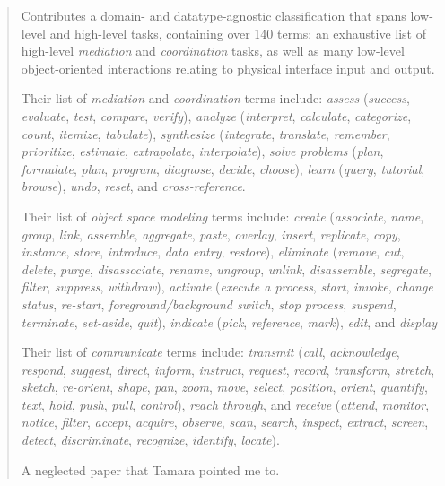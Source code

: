 \begin{quotation}
    Contributes a domain- and datatype-agnostic classification that spans low-level and high-level tasks, containing over 140 terms: an exhaustive list of high-level {\it mediation} and {\it coordination} tasks, as well as many low-level object-oriented interactions relating to physical interface input and output.
    
    Their list of {\it mediation} and {\it coordination} terms include: {\it assess} ({\it success}, {\it evaluate}, {\it test}, {\it compare}, {\it verify}), {\it analyze} ({\it interpret}, {\it calculate}, {\it categorize}, {\it count}, {\it itemize}, {\it tabulate}), {\it synthesize} ({\it integrate}, {\it translate}, {\it remember}, {\it prioritize}, {\it estimate}, {\it extrapolate}, {\it interpolate}), {\it solve problems} ({\it plan}, {\it formulate}, {\it plan}, {\it program}, {\it diagnose}, {\it decide}, {\it choose}), {\it learn} ({\it query}, {\it tutorial}, {\it browse}), {\it undo}, {\it reset}, and {\it cross-reference}.
    
    Their list of {\it object space modeling} terms include:
    {\it create} ({\it associate}, {\it name}, {\it group}, {\it link}, {\it assemble}, {\it aggregate}, {\it paste}, {\it overlay}, {\it insert}, {\it replicate}, {\it copy}, {\it instance}, {\it store}, {\it introduce}, {\it data entry}, {\it restore}), {\it eliminate} ({\it remove}, {\it cut}, {\it delete}, {\it purge}, {\it disassociate}, {\it rename}, {\it ungroup}, {\it unlink}, {\it disassemble}, {\it segregate}, {\it filter}, {\it suppress}, {\it withdraw}), {\it activate} ({\it execute a process}, {\it start}, {\it invoke}, {\it change status}, {\it re-start}, {\it foreground/background switch}, {\it stop process}, {\it suspend}, {\it terminate}, {\it set-aside}, {\it quit}), {\it indicate} ({\it pick}, {\it reference}, {\it mark}), {\it edit}, and {\it display}
    
    \begin{sloppypar}
    Their list of {\it communicate} terms include: {\it transmit} ({\it call}, {\it acknowledge}, {\it respond}, {\it suggest}, {\it direct}, {\it inform}, {\it instruct}, {\it request}, {\it record}, {\it transform}, {\it stretch}, {\it sketch}, {\it re-orient}, {\it shape}, {\it pan}, {\it zoom}, {\it move}, {\it select}, {\it position}, {\it orient}, {\it quantify}, {\it text}, {\it hold}, {\it push}, {\it pull}, {\it control}), {\it reach through}, and {\it receive} ({\it attend}, {\it monitor}, {\it notice}, {\it filter}, {\it accept}, {\it acquire}, {\it observe}, {\it scan}, {\it search}, {\it inspect}, {\it extract}, {\it screen}, {\it detect}, {\it discriminate}, {\it recognize}, {\it identify}, {\it locate}).
    \end{sloppypar}
    
    A neglected paper that Tamara pointed me to. 
\end{quotation}

